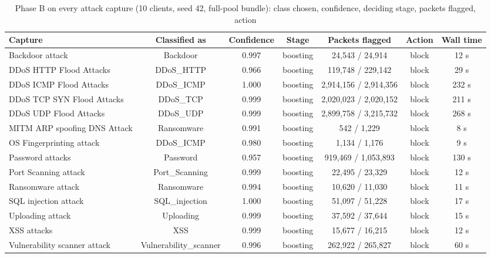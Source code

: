 \begin{table}[H]
\centering
\scriptsize
\setlength{\tabcolsep}{3pt}
\renewcommand{\arraystretch}{1.15}
\begin{tabular}{|l|c|c|c|c|c|c|}
\hline
\textbf{Capture} & \textbf{Classified as} & \textbf{Confidence} & \textbf{Stage} & \textbf{Packets flagged} & \textbf{Action} & \textbf{Wall time} \\ \hline
Backdoor attack & Backdoor & 0.997 & boosting & 24,543 / 24,914 & block & 12 s \\ \hline
DDoS HTTP Flood Attacks & DDoS\_HTTP & 0.966 & boosting & 119,748 / 229,142 & block & 29 s \\ \hline
DDoS ICMP Flood Attacks & DDoS\_ICMP & 1.000 & boosting & 2,914,156 / 2,914,356 & block & 232 s \\ \hline
DDoS TCP SYN Flood Attacks & DDoS\_TCP & 0.999 & boosting & 2,020,023 / 2,020,152 & block & 211 s \\ \hline
DDoS UDP Flood Attacks & DDoS\_UDP & 0.999 & boosting & 2,899,758 / 3,215,732 & block & 268 s \\ \hline
MITM ARP spoofing DNS Attack & Ransomware & 0.991 & boosting & 542 / 1,229 & block & 8 s \\ \hline
OS Fingerprinting attack & DDoS\_ICMP & 0.980 & boosting & 1,134 / 1,176 & block & 9 s \\ \hline
Password attacks & Password & 0.957 & boosting & 919,469 / 1,053,893 & block & 130 s \\ \hline
Port Scanning attack & Port\_Scanning & 0.999 & boosting & 22,495 / 23,329 & block & 12 s \\ \hline
Ransomware attack & Ransomware & 0.994 & boosting & 10,620 / 11,030 & block & 11 s \\ \hline
SQL injection attack & SQL\_injection & 1.000 & boosting & 51,097 / 51,228 & block & 17 s \\ \hline
Uploading attack & Uploading & 0.999 & boosting & 37,592 / 37,644 & block & 15 s \\ \hline
XSS attacks & XSS & 0.999 & boosting & 15,677 / 16,215 & block & 12 s \\ \hline
Vulnerability scanner attack & Vulnerability\_scanner & 0.996 & boosting & 262,922 / 265,827 & block & 60 s \\ \hline
\end{tabular}
\caption{Phase B on every attack capture (10 clients, seed 42, full-pool bundle): class chosen, confidence, deciding stage, packets flagged, action}
\label{tab:full_phase_b_all}
\end{table}
